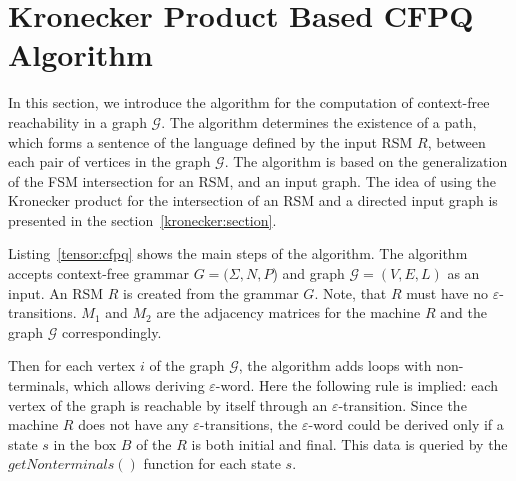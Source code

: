 \section{Kronecker Product Based CFPQ Algorithm}

In this section, we introduce the algorithm for the computation of context-free reachability in a graph $\mathcal{G}$.
The algorithm determines the existence of a path, which forms a sentence of the language defined by the input RSM $R$, between each pair of vertices in the graph $\mathcal{G}$.
The algorithm is based on the generalization of the FSM intersection for an RSM, and an input graph. The idea of using the Kronecker product for the intersection of an RSM and a directed input graph is presented in the section~\ref{kronecker:section}.



Listing~\ref{tensor:cfpq} shows the main steps of the algorithm.
The algorithm accepts context-free grammar $G=(\Sigma,N,P$) and graph $\mathcal{G}=(V,E,L)$ as an input.
An RSM $R$ is created from the grammar $G$.
Note, that $R$ must have no $\varepsilon$-transitions.
$M_1$ and $M_2$ are the adjacency matrices for the machine $R$ and the graph $\mathcal{G}$ correspondingly.

Then for each vertex $i$ of the graph $\mathcal{G}$, the algorithm adds loops with non-terminals, which allows deriving $\varepsilon$-word.
Here the following rule is implied: each vertex of the graph is reachable by itself through an $\varepsilon$-transition.
Since the machine $R$ does not have any $\varepsilon$-transitions, the $\varepsilon$-word could be derived only if a state $s$ in the box $B$ of the $R$ is both initial and final.
This data is queried by the $getNonterminals()$ function for each state $s$.

